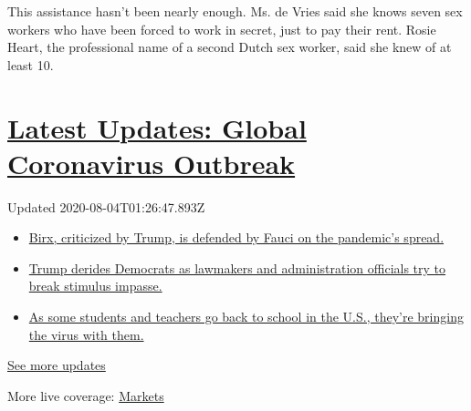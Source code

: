 This assistance hasn't been nearly enough. Ms. de Vries said she knows
seven sex workers who have been forced to work in secret, just to pay
their rent. Rosie Heart, the professional name of a second Dutch sex
worker, said she knew of at least 10.

\hypertarget{latest-updates-global-coronavirus-outbreak}{%
\section{\texorpdfstring{\href{https://www.nytimes.com/2020/08/03/world/coronavirus-covid-19.html?action=click\&pgtype=Article\&state=default\&region=MAIN_CONTENT_1\&context=storylines_live_updates}{Latest
Updates: Global Coronavirus
Outbreak}}{Latest Updates: Global Coronavirus Outbreak}}\label{latest-updates-global-coronavirus-outbreak}}

Updated 2020-08-04T01:26:47.893Z

\begin{itemize}
\tightlist
\item
  \href{https://www.nytimes.com/2020/08/03/world/coronavirus-covid-19.html?action=click\&pgtype=Article\&state=default\&region=MAIN_CONTENT_1\&context=storylines_live_updates\#link-4e40df05}{Birx,
  criticized by Trump, is defended by Fauci on the pandemic's spread.}
\item
  \href{https://www.nytimes.com/2020/08/03/world/coronavirus-covid-19.html?action=click\&pgtype=Article\&state=default\&region=MAIN_CONTENT_1\&context=storylines_live_updates\#link-15e7f995}{Trump
  derides Democrats as lawmakers and administration officials try to
  break stimulus impasse.}
\item
  \href{https://www.nytimes.com/2020/08/03/world/coronavirus-covid-19.html?action=click\&pgtype=Article\&state=default\&region=MAIN_CONTENT_1\&context=storylines_live_updates\#link-4c85ed64}{As
  some students and teachers go back to school in the U.S., they're
  bringing the virus with them.}
\end{itemize}

\href{https://www.nytimes.com/2020/08/03/world/coronavirus-covid-19.html?action=click\&pgtype=Article\&state=default\&region=MAIN_CONTENT_1\&context=storylines_live_updates}{See
more updates}

More live coverage:
\href{https://www.nytimes.com/live/2020/08/03/business/stock-market-today-coronavirus?action=click\&pgtype=Article\&state=default\&region=MAIN_CONTENT_1\&context=storylines_live_updates}{Markets}

